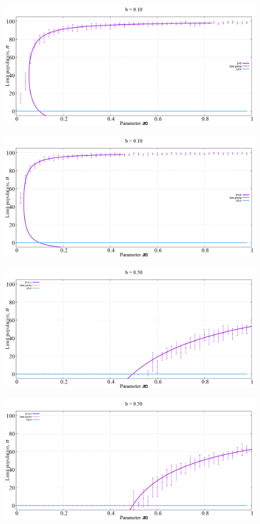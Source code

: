\begin{figure}[h!]
 \centering
  \includegraphics[width=\linewidth]{images/appendix/simexpt/4.png}
\end{figure}
\newpage
\begin{figure}[h!]
 \centering
  \includegraphics[width=\linewidth]{images/appendix/simexpt/5.png}
\end{figure}

\begin{figure}[h!]
 \centering
  \includegraphics[width=\linewidth]{images/appendix/simexpt/6.png}
\end{figure}
\newpage
\begin{figure}[h!]
 \centering
  \includegraphics[width=\linewidth]{images/appendix/simexpt/7.png}
\end{figure}

